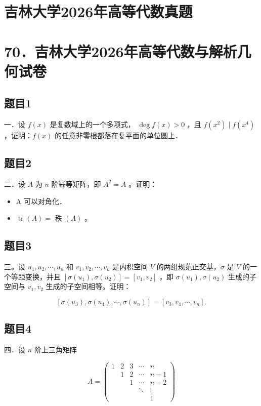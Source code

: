 \documentclass{article}
\begin{document}
\section*{吉林大学2026年高等代数真题}
\section*{70．吉林大学2026年高等代数与解析几何试卷}

\subsection{题目1}
一．设 \(f(x)\) 是复数域上的一个多项式， \(\operatorname{deg} f(x)>0\) ，且 \(f\left(x^{2}\right) \mid f\left(x^{4}\right)\) ，证明：\(f(x)\) 的任意非零根都落在复平面的单位圆上．

\subsection{题目2}
二．设 \(A\) 为 \(n\) 阶幂等矩阵，即 \(A^{2}=A\) 。证明：

\begin{itemize}
  \item[（1）] A 可以对角化．
  \item[（2）] \(\operatorname{tr}(A)=\) 秩 \((A)\) 。
\end{itemize}

\subsection{题目3}
三。设 \(u_{1}, u_{2}, \cdots, u_{n}\) 和 \(v_{1}, v_{2}, \cdots, v_{n}\) 是内积空间 \(V\) 的两组规范正交基，\(\sigma\) 是 \(V\) 的一个等距变换，并且 \(\left[\sigma\left(u_{1}\right), \sigma\left(u_{2}\right)\right]=\left[v_{1}, v_{2}\right]\) ，即 \(\sigma\left(u_{1}\right), \sigma\left(u_{2}\right)\) 生成的子空间与 \(v_{1}, v_{2}\) 生成的子空间相等。证明：

\[
\left[\sigma\left(u_{3}\right), \sigma\left(u_{4}\right), \cdots, \sigma\left(u_{n}\right)\right]=\left[v_{3}, v_{4}, \cdots, v_{n}\right] .
\]

\subsection{题目4}
四．设 \(n\) 阶上三角矩阵

\[
A=\left(\begin{array}{ccccc}
1 & 2 & 3 & \cdots & n \\
& 1 & 2 & \cdots & n-1 \\
& & 1 & \cdots & n-2 \\
& & & \ddots & \vdots \\
& & & & 1
\end{array}\right)
\]
\end{document}
